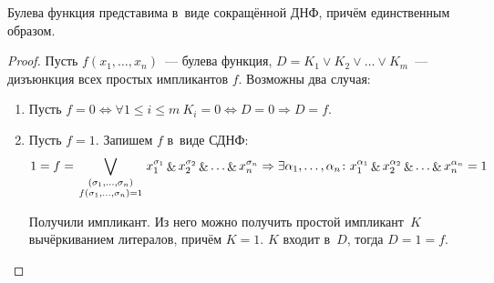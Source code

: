 \begin{statement}
Булева функция представима в~виде сокращённой ДНФ, причём единственным образом.
\end{statement}
\begin{proof}
Пусть $f(x_1, \ldots, x_n)$~--- булева функция, $D = K_1 \lor K_2 \lor \ldots \lor K_m$~--- дизъюнкция всех простых импликантов $f$.
Возможны два случая:
\begin{enumerate}
	\item Пусть $f = 0 \Leftrightarrow
	\forall 1 \leqslant i \leqslant m \ K_i = 0 \Leftrightarrow
	D = 0 \Rightarrow
	D = f$.
	
	\item Пусть $f = 1$.
	Запишем $f$ в~виде СДНФ:
	\begin{equation*}
	1 = f = \bigvee_{\begin{smallmatrix}
	(\sigma_1, \ldots, \sigma_n) \\
	f(\sigma_1, \ldots, \sigma_n) = 1
	\end{smallmatrix}} x_1^{\sigma_1} \mathop{\&} x_2^{\sigma_2} \mathop{\&} \ldots \mathop{\&} x_n^{\sigma_n} \Rightarrow
	\exists \alpha_1, \ldots, \alpha_n \colon x_1^{\alpha_1} \mathop{\&} x_2^{\alpha_2} \mathop{\&} \ldots \mathop{\&} x_n^{\alpha_n} = 1
	\end{equation*}
	
	Получили импликант.
	Из него можно получить простой импликант~$K$ вычёркиванием литералов, причём $K = 1$.
	$K$ входит в~$D$, тогда $D = 1 = f$.
\end{enumerate}
\end{proof}